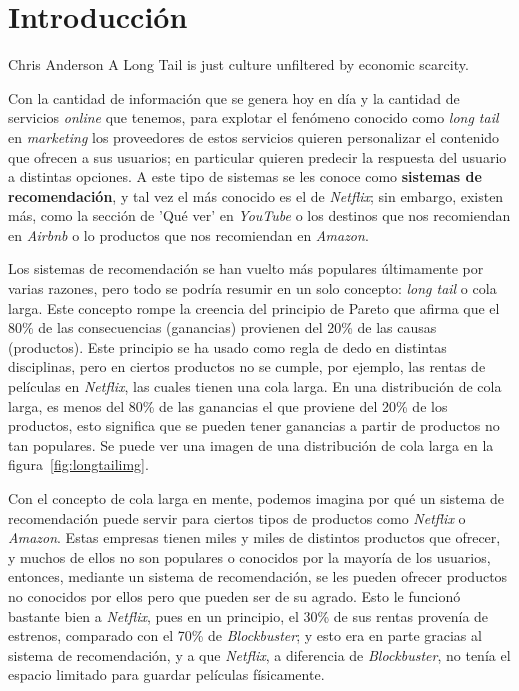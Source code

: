 \chapter{Introducción}
\label{ch:intro}

\begin{chapterquote}{Chris Anderson}
	A Long Tail is just culture  unfiltered by economic scarcity.
\end{chapterquote}

Con la cantidad de información que se genera hoy en día y la cantidad de servicios \textit{online} que tenemos, para explotar el fenómeno conocido como \textit{long tail} en \textit{marketing} los proveedores de estos servicios quieren personalizar el contenido que ofrecen a sus usuarios; en particular quieren predecir la respuesta del usuario a distintas opciones. A este tipo de sistemas se les conoce como \textbf{sistemas de recomendación}, y tal vez el más conocido es el de \textit{Netflix}; sin embargo, existen más, como la sección de 'Qué ver' en \textit{YouTube} o los destinos que nos recomiendan en \textit{Airbnb} o lo productos que nos recomiendan en \textit{Amazon}.

Los sistemas de recomendación se han vuelto más populares últimamente por varias razones, pero todo se podría resumir en un solo concepto: \textit{long tail} o cola larga. Este concepto rompe la creencia del principio de Pareto que afirma que el 80\% de las consecuencias (ganancias) provienen del 20\% de las causas (productos). Este principio se ha usado como regla de dedo en distintas disciplinas, pero en ciertos productos no se cumple, por ejemplo, las rentas de películas en \textit{Netflix}, las cuales tienen una cola larga. En una distribución de cola larga, es menos del 80\% de las ganancias el que proviene del 20\% de los productos, esto significa que se pueden tener ganancias a partir de productos no tan populares. Se puede ver una imagen de una distribución de cola larga en la figura~\ref{fig:longtailimg}.

Con el concepto de cola larga en mente, podemos imagina por qué un sistema de recomendación puede servir para ciertos tipos de productos como \textit{Netflix} o \textit{Amazon}. Estas empresas tienen miles y miles de distintos productos que ofrecer, y muchos de ellos no son populares o conocidos por la mayoría de los usuarios, entonces, mediante un sistema de recomendación, se les pueden ofrecer productos no conocidos por ellos pero que pueden ser de su agrado. Esto le funcionó bastante bien a \textit{Netflix}, pues en un principio, el 30\% de sus rentas provenía de estrenos, comparado con el 70\% de \textit{Blockbuster}; y esto era en parte gracias al sistema de recomendación, y a que \textit{Netflix}, a diferencia de \textit{Blockbuster}, no tenía el espacio limitado para guardar películas físicamente.

